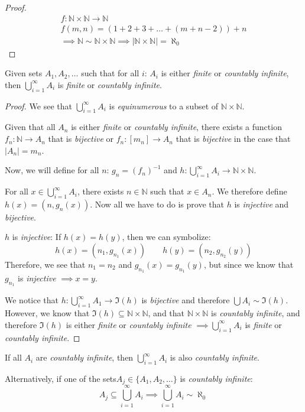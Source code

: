 \documentclass[00_complete]{subfiles}
\begin{document}
\begin{proof}
    \begin{gather*}
        f:\mathbb{N}\times\mathbb{N}\to\mathbb{N} \\
        f(m,n)=(1+2+3+\dots+(m+n-2)) + n \\
        \implies \mathbb{N} \sim \mathbb{N}\times\mathbb{N} \implies
        |\mathbb{N}\times\mathbb{N}|=\aleph_0
    \end{gather*}
\end{proof}
\begin{claim}
    Given sets $A_1, A_2,\dots$ such that for all $i$: $A_i$ is either
    \emph{finite} or \emph{countably infinite}, then $\bigcup_{i=1}^\infty A_i$
    is \emph{finite} or \emph{countably infinite}.
\end{claim}
\begin{proof}
    We see that $\bigcup_{i=1}^\infty A_i$ is \emph{equinumerous} to a subset of
    $\mathbb{N}\times\mathbb{N}$.

    Given that all $A_n$ is either \emph{finite} or \emph{countably infinite},
    there exists a function $f_n: \mathbb{N} \to A_n$ that is \emph{bijective}
    or $f_n:[m_n]\to A_n$ that is \emph{bijective} in the case that
    $|A_n|=m_n$.

    Now, we will define for all $n$: $g_n=(f_n)^{-1}$ and $h:
    \bigcup_{i=1}^\infty A_i \to \mathbb{N}\times\mathbb{N}$.

    For all $x \in \bigcup_{i=1}^\infty A_i$, there exists $n \in \mathbb{N}$
    such that $x \in A_n$. We therefore define $h(x)=(n,g_n(x))$. Now all we
    have to do is prove that $h$ is \emph{injective} and \emph{bijective}.

    $h$ is \emph{injective}: If $h(x)=h(y)$, then we can symbolize:
    $$h(x)=(n_1,g_{n_1}(x)) \qquad h(y)=(n_2,g_{n_2}(y))$$
    Therefore, we see that $n_1=n_2$ and $g_{n_1}(x)=g_{n_1}(y)$, but since we
    know that $g_{n_1}$ is \emph{injective} $\implies x=y$.

    We notice that $h:\bigcup_{i=1}^\infty A_1 \to \Im(h)$ is \emph{bijective}
    and therefore $\bigcup A_i \sim \Im(h)$. However, we know that
    $\Im(h)\subseteq \mathbb{N}\times\mathbb{N}$, and that
    $\mathbb{N}\times\mathbb{N}$ is \emph{countably infinite}, and therefore
    $\Im(h)$ is either \emph{finite} or \emph{countably infinite} $\implies
    \bigcup_{i=1}^\infty A_i$ is \emph{finite} or \emph{countably infinite}.
\end{proof}
\begin{note}
    If all $A_i$ are \emph{countably infinite}, then $\bigcup_{i=1}^\infty A_i$
    is also \emph{countably infinite}.
\end{note}
Alternatively, if one of the sets$A_j \in \{A_1,A_2,\dots\}$ is \emph{countably infinite}:
$$A_j \subseteq \bigcup_{i=1}^\infty A_i \implies \bigcup_{i=1}^\infty A_i \sim
\aleph_0$$
\end{document}
